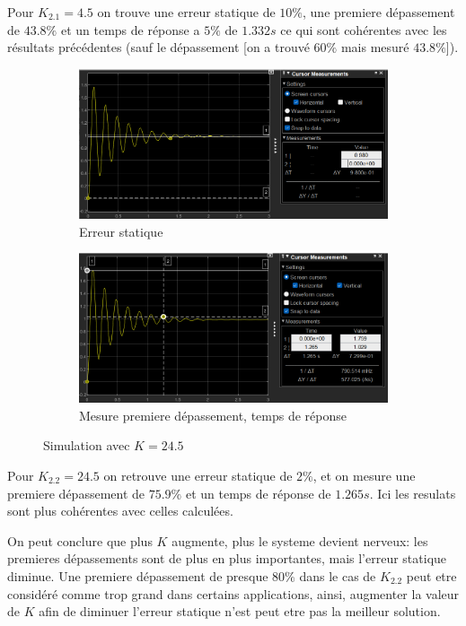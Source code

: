 \documentclass[12pt, a4paper]{report}
\begin{document}
Pour $K_{2.1} = 4.5$ on trouve une erreur statique de $10\%$, une premiere dépassement de $43.8\%$ et un temps de
réponse a $5\%$ de $1.332s$ ce qui sont cohérentes avec les résultats précédentes (sauf le dépassement [on a trouvé $60\%$ mais mesuré $43.8\%$]).

\begin{figure}[H]
    \begin{subfigure}[h!]{0.4\linewidth}
        \includegraphics[width=\linewidth]{sim2kpourerreur2prcerreur.png}
        \caption{Erreur statique}
    \end{subfigure}
    \hfill    
    \begin{subfigure}[h!]{0.4\linewidth}
        \includegraphics[width=\linewidth]{sim2kpourerreur2prcdeptr.png}
        \caption{Mesure premiere dépassement, temps de réponse}
    \end{subfigure}
    \caption{Simulation avec $K = 24.5$}
    \label{fig:sim2Kpour10prc}
\end{figure}

Pour $K_{2.2} = 24.5$ on retrouve une erreur statique de $2\%$, et on mesure une premiere dépassement de $75.9\%$ et un temps de réponse de 
$1.265s$. Ici les resulats sont plus cohérentes avec celles calculées.

On peut conclure que plus $K$ augmente, plus le systeme devient nerveux: les premieres dépassements sont de plus en plus importantes, mais l'erreur statique diminue.
Une premiere dépassement de presque $80\%$ dans le cas de $K_{2.2}$ peut etre considéré comme trop grand dans certains applications, ainsi, augmenter la valeur de $K$ afin de 
diminuer l'erreur statique n'est peut etre pas la meilleur solution.
\end{document}
